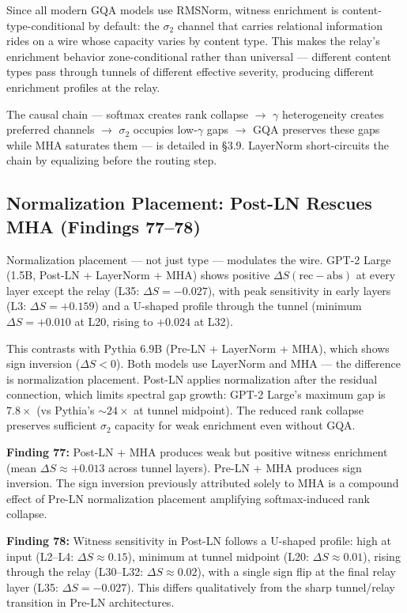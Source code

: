 \documentclass[12pt]{article}
\begin{document}
Since all modern GQA models use RMSNorm, witness enrichment is content-type-conditional by default: the $\sigma_2$ channel that carries relational information rides on a wire whose capacity varies by content type. This makes the relay's enrichment behavior zone-conditional rather than universal --- different content types pass through tunnels of different effective severity, producing different enrichment profiles at the relay.

The causal chain --- softmax creates rank collapse $\to$ $\gamma$ heterogeneity creates preferred channels $\to$ $\sigma_2$ occupies low-$\gamma$ gaps $\to$ GQA preserves these gaps while MHA saturates them --- is detailed in \S3.9. LayerNorm short-circuits the chain by equalizing before the routing step.

\subsection{Normalization Placement: Post-LN Rescues MHA (Findings 77--78)}

Normalization placement --- not just type --- modulates the wire. GPT-2 Large (1.5B, Post-LN + LayerNorm + MHA) shows positive $\Delta S(\text{rec}-\text{abs})$ at every layer except the relay (L35: $\Delta S = -0.027$), with peak sensitivity in early layers (L3: $\Delta S = +0.159$) and a U-shaped profile through the tunnel (minimum $\Delta S = +0.010$ at L20, rising to $+0.024$ at L32).

This contrasts with Pythia 6.9B (Pre-LN + LayerNorm + MHA), which shows sign inversion ($\Delta S < 0$). Both models use LayerNorm and MHA --- the difference is normalization placement. Post-LN applies normalization after the residual connection, which limits spectral gap growth: GPT-2 Large's maximum gap is $7.8\times$ (vs Pythia's ${\sim}24\times$ at tunnel midpoint). The reduced rank collapse preserves sufficient $\sigma_2$ capacity for weak enrichment even without GQA.

\textbf{Finding 77:} Post-LN + MHA produces weak but positive witness enrichment (mean $\Delta S \approx +0.013$ across tunnel layers). Pre-LN + MHA produces sign inversion. The sign inversion previously attributed solely to MHA is a compound effect of Pre-LN normalization placement amplifying softmax-induced rank collapse.

\textbf{Finding 78:} Witness sensitivity in Post-LN follows a U-shaped profile: high at input (L2--L4: $\Delta S \approx 0.15$), minimum at tunnel midpoint (L20: $\Delta S \approx 0.01$), rising through the relay (L30--L32: $\Delta S \approx 0.02$), with a single sign flip at the final relay layer (L35: $\Delta S = -0.027$). This differs qualitatively from the sharp tunnel/relay transition in Pre-LN architectures.
\end{document}
